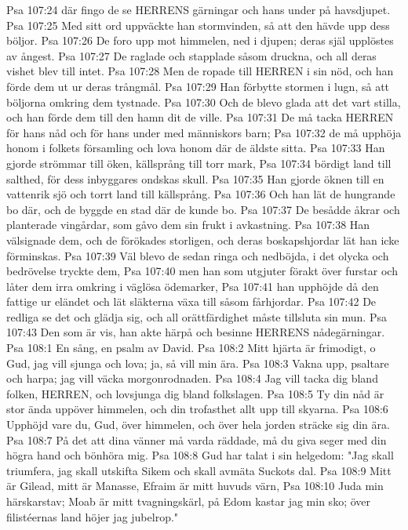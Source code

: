 Psa 107:24  där fingo de se HERRENS gärningar och hans under på havsdjupet.
Psa 107:25  Med sitt ord uppväckte han stormvinden, så att den hävde upp dess böljor.
Psa 107:26  De foro upp mot himmelen, ned i djupen; deras själ upplöstes av ångest.
Psa 107:27  De raglade och stapplade såsom druckna, och all deras vishet blev till intet.
Psa 107:28  Men de ropade till HERREN i sin nöd, och han förde dem ut ur deras trångmål.
Psa 107:29  Han förbytte stormen i lugn, så att böljorna omkring dem tystnade.
Psa 107:30  Och de blevo glada att det vart stilla, och han förde dem till den hamn dit de ville.
Psa 107:31  De må tacka HERREN för hans nåd och för hans under med människors barn;
Psa 107:32  de må upphöja honom i folkets församling och lova honom där de äldste sitta.
Psa 107:33  Han gjorde strömmar till öken, källsprång till torr mark,
Psa 107:34  bördigt land till salthed, för dess inbyggares ondskas skull.
Psa 107:35  Han gjorde öknen till en vattenrik sjö och torrt land till källsprång.
Psa 107:36  Och han lät de hungrande bo där, och de byggde en stad där de kunde bo.
Psa 107:37  De besådde åkrar och planterade vingårdar, som gåvo dem sin frukt i avkastning.
Psa 107:38  Han välsignade dem, och de förökades storligen, och deras boskapshjordar lät han icke förminskas.
Psa 107:39  Väl blevo de sedan ringa och nedböjda, i det olycka och bedrövelse tryckte dem,
Psa 107:40  men han som utgjuter förakt över furstar och låter dem irra omkring i väglösa ödemarker,
Psa 107:41  han upphöjde då den fattige ur eländet och lät släkterna växa till såsom fårhjordar.
Psa 107:42  De redliga se det och glädja sig, och all orättfärdighet måste tillsluta sin mun.
Psa 107:43  Den som är vis, han akte härpå och besinne HERRENS nådegärningar.
Psa 108:1  En sång, en psalm av David.
Psa 108:2  Mitt hjärta är frimodigt, o Gud, jag vill sjunga och lova; ja, så vill min ära.
Psa 108:3  Vakna upp, psaltare och harpa; jag vill väcka morgonrodnaden.
Psa 108:4  Jag vill tacka dig bland folken, HERREN, och lovsjunga dig bland folkslagen.
Psa 108:5  Ty din nåd är stor ända uppöver himmelen, och din trofasthet allt upp till skyarna.
Psa 108:6  Upphöjd vare du, Gud, över himmelen, och över hela jorden sträcke sig din ära.
Psa 108:7  På det att dina vänner må varda räddade, må du giva seger med din högra hand och bönhöra mig.
Psa 108:8  Gud har talat i sin helgedom: "Jag skall triumfera, jag skall utskifta Sikem och skall avmäta Suckots dal.
Psa 108:9  Mitt är Gilead, mitt är Manasse, Efraim är mitt huvuds värn,
Psa 108:10  Juda min härskarstav; Moab är mitt tvagningskärl, på Edom kastar jag min sko; över filistéernas land höjer jag jubelrop."
